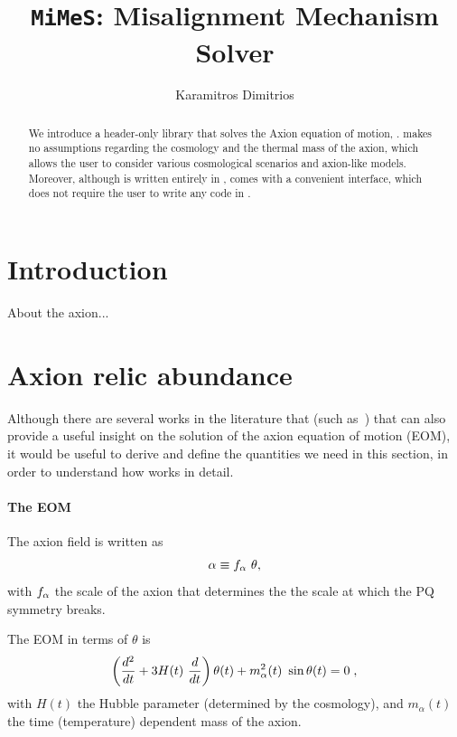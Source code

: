\documentclass[11pt,a4paper]{article}
\author{Karamitros Dimitrios}
\title{{\tt MiMeS}: Misalignment Mechanism Solver}
\begin{document}
\maketitle

\begin{abstract}
	We introduce a \CPP header-only library that solves the Axion equation of motion, \mimes.  
	\mimes makes no assumptions regarding the cosmology and the thermal mass of the axion, which allows the user 
	to consider various cosmological scenarios and axion-like models.
	Moreover, although is written entirely in \CPP, \mimes comes with a convenient \PY interface, which does not require the
	user to write any code in \CPP.
\end{abstract}


\section{Introduction}\label{sec:intro}
\setcounter{equation}{0}

About the axion...

\section{Axion relic abundance}\label{sec:abundance}
\setcounter{equation}{0}
%
Although there are several works in the literature that (such as~\cite{Chang:1998ys}) that can also provide a useful insight on the solution of the axion equation of motion (EOM), it would be useful to derive and define the quantities we need in this section, in order to understand how \mimes works in detail.

\paragraph{The EOM} The axion field is written as 
%
\begin{equation}
	\alpha  \equiv f_{\alpha}{} \ \theta,
	\label{eq:fa_def}
\end{equation}
%
with $f_{\alpha}{}$ the scale of the axion that determines the the scale at which the PQ symmetry breaks. 

The EOM in terms of $\theta$ is 
%
\begin{equation}
	\lrb{\dfrac{d^2}{d t} + 3 H(t) \ \dfrac{d}{d t} } \theta(t) + m_{\alpha}^2(t) \ \sin \theta(t) = 0 \; ,
	\label{eq:eom}
\end{equation}
%
with $H(t)$ the Hubble parameter (determined by the cosmology), and $m_{\alpha}(t)$  the time (temperature) dependent mass of the axion. 
\end{document}
